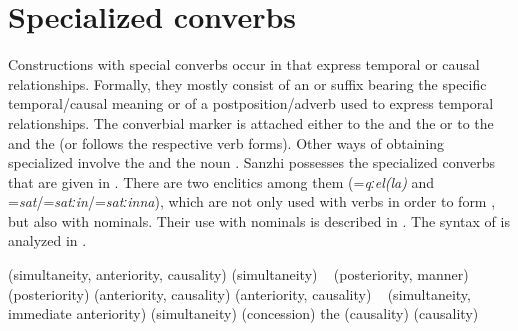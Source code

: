 \section{Specialized converbs}
\label{cpt:specializedconverbssubordinatingenclitics}

Constructions with special converbs occur in  that express temporal or causal relationships. Formally, they mostly consist of an  or suffix bearing the specific temporal/causal meaning or of a postposition\slash adverb used to express temporal relationships. The converbial marker is attached either to the  and the  or to the  and the  (or follows the respective verb forms). Other ways of obtaining specialized  involve the  and the noun  . Sanzhi possesses the specialized converbs that are given in . There are two enclitics among them (=\textit{qːel(la)} and =\textit{sat}\slash =\textit{satːin}\slash =\textit{satːinna}), which are not only used with verbs in order to form , but also with nominals. Their use with nominals is described in . The syntax of  is analyzed in .

\begin{exe}
	\ex	\label{ex:Specialized converbs and subordinating enclitics}
	\begin{xlist}
		\TabPositions{14em}
		\ex	{} 	\tab	(simultaneity, anteriority, causality)	   
		\ex	{} 				\tab	(simultaneity)
		\ex	{} 
		\sn	~\hspace*{1em}					\tab	(posteriority, manner)	   
		\ex	{} 			\tab	(posteriority)
		\ex	{} 			\tab	(anteriority, causality)
		\ex	{} 				\tab	(anteriority, causality)	   
		\ex	{} 
		\sn	~\hspace*{1em}					\tab	(simultaneity, immediate anteriority)	   
		\ex	{} 				\tab	(simultaneity)	   
		\ex	{} 		\tab	(concession)	   
		\ex	the  			\tab	(causality)	   
		\ex	{} 	\tab	(causality)	
	\end{xlist}
\end{exe}


